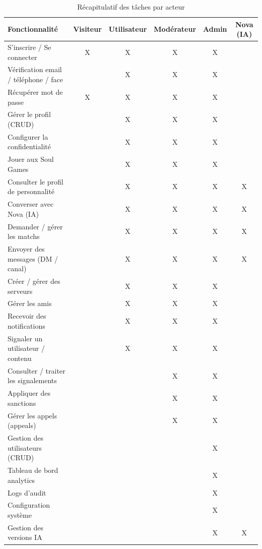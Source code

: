 \begin{table}[h]
\centering
\begin{tabular}{|l|c|c|c|c|c|}
\hline
\textbf{Fonctionnalité} & \textbf{Visiteur} & \textbf{Utilisateur} & \textbf{Modérateur} & \textbf{Admin} & \textbf{Nova (IA)} \\ \hline
S'inscrire / Se connecter & X & X & X & X & \\ \hline
Vérification email / téléphone / face & & X & X & X & \\ \hline
Récupérer mot de passe & X & X & X & X & \\ \hline
Gérer le profil (CRUD) & & X & X & X & \\ \hline
Configurer la confidentialité & & X & X & X & \\ \hline
Jouer aux Soul Games & & X & X & X & \\ \hline
Consulter le profil de personnalité & & X & X & X & X \\ \hline
Converser avec Nova (IA) & & X & X & X & X \\ \hline
Demander / gérer les matchs & & X & X & X & X \\ \hline
Envoyer des messages (DM / canal) & & X & X & X & X \\ \hline
Créer / gérer des serveurs & & X & X & X & \\ \hline
Gérer les amis & & X & X & X & \\ \hline
Recevoir des notifications & & X & X & X & \\ \hline
Signaler un utilisateur / contenu & & X & X & X & \\ \hline
Consulter / traiter les signalements & & & X & X & \\ \hline
Appliquer des sanctions & & & X & X & \\ \hline
Gérer les appels (appeals) & & & X & X & \\ \hline
Gestion des utilisateurs (CRUD) & & & & X & \\ \hline
Tableau de bord analytics & & & & X & \\ \hline
Logs d'audit & & & & X & \\ \hline
Configuration système & & & & X & \\ \hline
Gestion des versions IA & & & & X & X \\ \hline
\end{tabular}
\caption{Récapitulatif des tâches par acteur}
\end{table}
